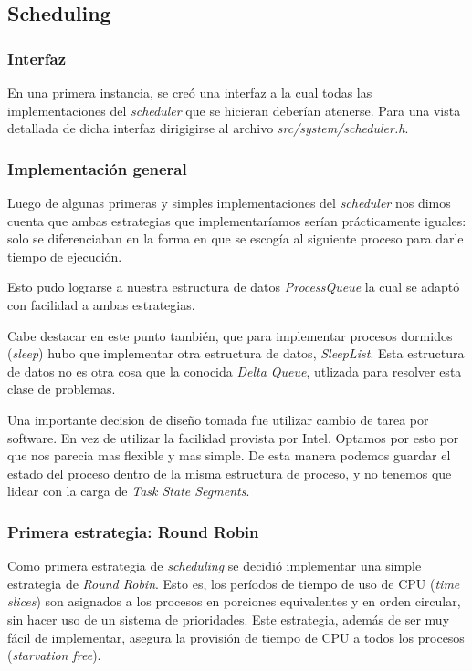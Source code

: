 \documentclass[a4paper,10pt]{article}
\begin{document}
    \subsection{Scheduling}
        
        \subsubsection{Interfaz}
        En una primera instancia, se creó una interfaz a la cual todas las implementaciones del \textit{scheduler} que se hicieran
	deberían atenerse. Para una vista detallada de dicha interfaz dirigigirse al archivo \textit{src/system/scheduler.h}.

        \subsubsection{Implementación general}
	Luego de algunas primeras y simples implementaciones del \textit{scheduler} nos dimos cuenta que ambas estrategias que 
	implementaríamos serían prácticamente iguales: solo se diferenciaban en la forma en que se escogía al siguiente proceso
	para darle tiempo de ejecución. 

	Esto pudo lograrse a nuestra estructura de datos \textit{ProcessQueue} la cual se adaptó con facilidad a ambas estrategias.

	Cabe destacar en este punto también, que para implementar procesos dormidos (\textit{sleep}) hubo que implementar otra estructura
	de datos, \textit{SleepList}. Esta estructura de datos no es otra cosa que la conocida \textit{Delta Queue}, utlizada para resolver 
	esta clase de problemas.

    Una importante decision de diseño tomada fue utilizar cambio de tarea por software.
    En vez de utilizar la facilidad provista por Intel.
    Optamos por esto por que nos parecia mas flexible y mas simple.
    De esta manera podemos guardar el estado del proceso dentro de la misma estructura de proceso, y no tenemos que lidear con la carga de \textit{Task State Segments}.

        \subsubsection{Primera estrategia: Round Robin}
        Como primera estrategia de \textit{scheduling} se decidió implementar una simple estrategia de \textit{Round Robin}.
        Esto es, los períodos de tiempo de uso de CPU (\textit{time slices}) son asignados a los procesos en porciones 
        equivalentes y en orden circular, sin hacer uso de un sistema de prioridades. Este estrategia, además de ser muy 
        fácil de implementar, asegura la provisión de tiempo de CPU a todos los procesos (\textit{starvation free}).
\end{document}
